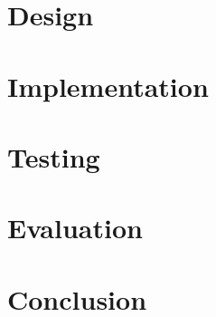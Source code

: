 \documentclass[11pt]{book}
\begin{document}
\chapter{Design}

\chapter{Implementation}

\chapter{Testing}

\chapter{Evaluation}

\chapter{Conclusion}
\end{document}
